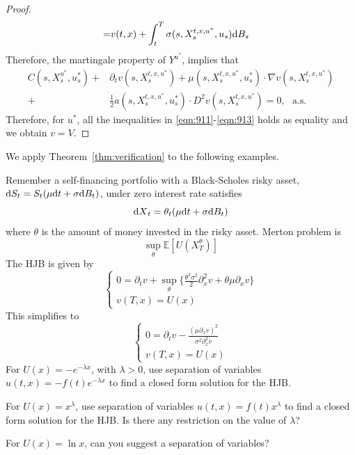 \documentclass[11pt]{book}
\newcommand{\dd}{\text{\normalfont d}}
\newcommand{\dt}{\text{\normalfont d}t}
\newcommand{\dX}{\text{\normalfont d}X}
\begin{document}
\begin{proof}
\begin{equation}
\begin{split}
=&v(t,x)+\int_t^T\sigma(s,X_s^{t,x,u^*},u_s){\dd}B_s
\end{split}
\end{equation}
Therefore, the martingale property of $Y^{u^*}$, implies that
\begin{equation}
\begin{split}
C(s,X_s^{u^*},u^*_s)+&\partial_{t}v(s,X_s^{t,x,u^*})+\mu(s,X_s^{t,x,u^*},u^*_s)\cdot\nabla v(s,X_s^{t,x,u^*})\\
+&\frac12{a(s,X_s^{t,x,u^*},u^*_s)}\cdot D^2v(s,X_s^{t,x,u^*})=0,~~~\textrm{a.s.}
\end{split}
\end{equation}
Therefore, for $u^*$, all the inequalities in \eqref{eqn:911}-\eqref{eqn:913} holds as equality and we obtain $v=V$.
\end{proof}
We apply Theorem~\eqref{thm:verification} to the following examples.
\begin{ex}
    {}
    Remember a self-financing portfolio with a 
    Black-Scholes risky asset, 
    ${{\dd}}S_t=S_t(\mu {{\dt}}+\sigma {\dd}B_t)$, 
    under zero interest rate  satisfies
    \begin{equation}
        {\dX}_t=\theta_t(\mu {{\dt}}+ \sigma {\dd}B_t)
    \end{equation}
    where $\theta$ is the amount of money invested in the risky asset.
    Merton problem is 
    \begin{equation}
        \sup_{\theta}\mathbb{E}[U(X_T^\theta)]
    \end{equation}
     The HJB is given by
     \begin{equation}
         \begin{cases}
             0=\partial_t v+ \sup_{\theta}\bigg\{\frac{\theta^2\sigma^2}{2}\partial^2_x v+\theta\mu \partial_x v\bigg\}\\
             v(T,x)=U(x)
         \end{cases}
     \end{equation}
     This simplifies to 
          \begin{equation}\label{eqn:HJB_merton_investment}
         \begin{cases}
             0=\partial_t v-\frac{(\mu \partial_x v)^2}{\sigma^2 \partial^2_x v}\\
             v(T,x)=U(x)
         \end{cases}
     \end{equation}
     For $U(x)=-e^{-\lambda x}$, with $\lambda>0$, use separation of variables $u(t,x)=-f(t)e^{-\lambda x}$ to find a closed form solution for the HJB.
\end{ex}
\begin{ex}
    For $U(x)=x^\lambda$, use separation of variables $u(t,x)=f(t)x^\lambda$ to find a closed form solution for the HJB. Is there any restriction on the value of $\lambda$?
\end{ex}
\begin{ex}
    For $U(x)=\ln x$, can you suggest a separation of variables?
\end{ex}
\end{document}

